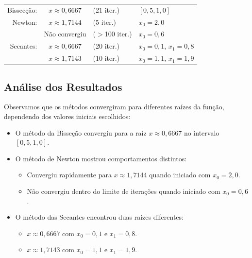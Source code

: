 \documentclass{article}
\begin{document}
\begin{center}
\begin{tabular}{rcll}
Bissecção: & $x \approx 0,6667$ & (21 iter.)     & $[0,5, 1,0]$ \\
Newton:    & $x \approx 1,7144$ & (5 iter.)      & $x_0 = 2,0$ \\
           & Não convergiu      & ($>$100 iter.) & $x_0 = 0,6$ \\
Secantes:  & $x \approx 0,6667$ & (20 iter.)     & $x_0 = 0,1$, $x_1 = 0,8$ \\
           & $x \approx 1,7143$ & (10 iter.)     & $x_0 = 1,1$, $x_1 = 1,9$
\end{tabular}
\end{center}


\subsection{An\'{a}lise dos Resultados}

Observamos que os m\'{e}todos convergiram para diferentes ra\'{i}zes da fun\c{c}\~{a}o, dependendo dos valores iniciais escolhidos:


\begin{itemize}
    \item O m\'{e}todo da Bisse\c{c}\~{a}o convergiu para a ra\'{i}z $x \approx 0,6667$ no intervalo $[0,5, 1,0]$.
    \item O m\'{e}todo de Newton mostrou comportamentos distintos:
    \begin{itemize}
        \item Convergiu rapidamente para $x \approx 1,7144$ quando iniciado com $x_0 = 2,0$.
        \item N\~{a}o convergiu dentro do limite de itera\c{c}\~{o}es quando iniciado com $x_0 = 0,6$.
    \end{itemize}
    \item O m\'{e}todo das Secantes encontrou duas ra\'{i}zes diferentes:
    \begin{itemize}
        \item $x \approx 0,6667$ com $x_0 = 0,1$ e $x_1 = 0,8$.
        \item $x \approx 1,7143$ com $x_0 = 1,1$ e $x_1 = 1,9$.
    \end{itemize}
\end{itemize}
\end{document}
